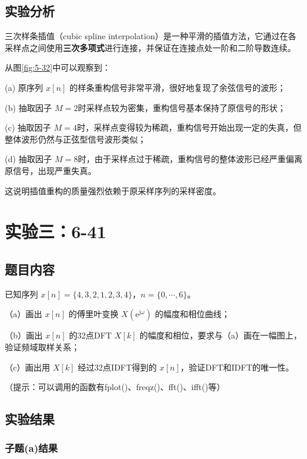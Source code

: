 \documentclass[UTF8,12pt,a4paper]{ctexart}
\begin{document}
\subsection{实验分析}

三次样条插值（cubic spline interpolation）是一种平滑的插值方法，它通过在各采样点之间使用\textbf{三次多项式}进行连接，并保证在连接点处一阶和二阶导数连续。

从图\ref{fig:5-32}中可以观察到：

(a) 原序列 $x[n]$ 的样条重构信号非常平滑，很好地复现了余弦信号的波形；

(b) 抽取因子 $M=2$时采样点较为密集，重构信号基本保持了原信号的形状；

(c) 抽取因子 $M=4$时，采样点变得较为稀疏，重构信号开始出现一定的失真，但整体波形仍然与正弦型信号波形类似；

(d) 抽取因子 $M=8$时，由于采样点过于稀疏，重构信号的整体波形已经严重偏离原信号，出现严重失真。

这说明插值重构的质量强烈依赖于原采样序列的采样密度。

\newpage
\section{实验三：6-41}

\subsection{题目内容}

已知序列 $x[n] = \{4,3,2,1,2,3,4\}$，$n = \{0,\cdots,6\}$。

（a）画出 $x[n]$ 的傅里叶变换 $X(\mathrm{e}^{\mathrm{j}\omega})$ 的幅度和相位曲线；

（b）画出 $x[n]$ 的32点DFT $X[k]$ 的幅度和相位，要求与（a）画在一幅图上，验证频域取样关系；

（c）画出用 $X[k]$ 经过32点IDFT得到的 $x[n]$，验证DFT和IDFT的唯一性。

（提示：可以调用的函数有fplot()、freqz()、fft()、ifft()等）

\subsection{实验结果}

\subsubsection{子题(a)结果}
\end{document}
